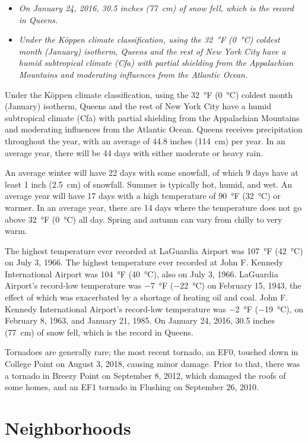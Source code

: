 \begin{itemize}
\item
  \emph{On January 24, 2016, 30.5 inches (77~cm) of snow fell, which is
  the record in Queens.}
\item
  \emph{Under the Köppen climate classification, using the 32~°F (0~°C)
  coldest month (January) isotherm, Queens and the rest of New York City
  have a humid subtropical climate (Cfa) with partial shielding from the
  Appalachian Mountains and moderating influences from the Atlantic
  Ocean.}
\end{itemize}

Under the Köppen climate classification, using the 32~°F (0~°C) coldest
month (January) isotherm, Queens and the rest of New York City have a
humid subtropical climate (Cfa) with partial shielding from the
Appalachian Mountains and moderating influences from the Atlantic Ocean.
Queens receives precipitation throughout the year, with an average of
44.8 inches (114~cm) per year. In an average year, there will be 44 days
with either moderate or heavy rain.

An average winter will have 22 days with some snowfall, of which 9 days
have at least 1 inch (2.5~cm) of snowfall. Summer is typically hot,
humid, and wet. An average year will have 17 days with a high
temperature of 90~°F (32~°C) or warmer. In an average year, there are 14
days where the temperature does not go above 32~°F (0~°C) all day.
Spring and autumn can vary from chilly to very warm.

The highest temperature ever recorded at LaGuardia Airport was 107~°F
(42~°C) on July 3, 1966. The highest temperature ever recorded at John
F. Kennedy International Airport was 104~°F (40~°C), also on July 3,
1966. LaGuardia Airport's record-low temperature was −7~°F (−22~°C) on
February 15, 1943, the effect of which was exacerbated by a shortage of
heating oil and coal. John F. Kennedy International Airport's record-low
temperature was −2~°F (−19~°C), on February 8, 1963, and January 21,
1985. On January 24, 2016, 30.5 inches (77~cm) of snow fell, which is
the record in Queens.

Tornadoes are generally rare; the most recent tornado, an EF0, touched
down in College Point on August 3, 2018, causing minor damage. Prior to
that, there was a tornado in Breezy Point on September 8, 2012, which
damaged the roofs of some homes, and an EF1 tornado in Flushing on
September 26, 2010.

\section{Neighborhoods}\label{neighborhoods}

